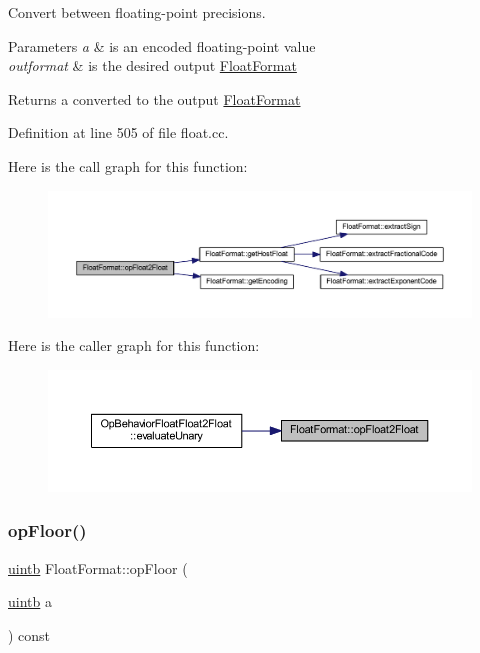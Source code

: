Convert between floating-\/point precisions. 


\begin{DoxyParams}{Parameters}
{\em a} & is an encoded floating-\/point value \\
\hline
{\em outformat} & is the desired output \mbox{\hyperlink{class_float_format}{Float\+Format}} \\
\hline
\end{DoxyParams}
\begin{DoxyReturn}{Returns}
a converted to the output \mbox{\hyperlink{class_float_format}{Float\+Format}} 
\end{DoxyReturn}


Definition at line 505 of file float.\+cc.

Here is the call graph for this function\+:
\nopagebreak
\begin{figure}[H]
\begin{center}
\leavevmode
\includegraphics[width=350pt]{class_float_format_a4adac47dcb6d1ddbcf9c5f6980528fd2_cgraph}
\end{center}
\end{figure}
Here is the caller graph for this function\+:
\nopagebreak
\begin{figure}[H]
\begin{center}
\leavevmode
\includegraphics[width=350pt]{class_float_format_a4adac47dcb6d1ddbcf9c5f6980528fd2_icgraph}
\end{center}
\end{figure}
\mbox{\label{class_float_format_ad2e38aad3a27346e0eb55aedcbf531cd}} 
\subsubsection{\texorpdfstring{opFloor()}{opFloor()}}
{\footnotesize\ttfamily \mbox{\hyperlink{types_8h_a2db313c5d32a12b01d26ac9b3bca178f}{uintb}} Float\+Format\+::op\+Floor (\begin{DoxyParamCaption}\item[{\mbox{\hyperlink{types_8h_a2db313c5d32a12b01d26ac9b3bca178f}{uintb}}}]{a }\end{DoxyParamCaption}) const}



